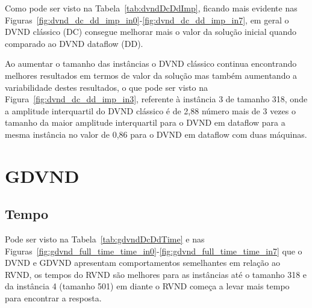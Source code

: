 Como pode ser visto na Tabela~\ref{tab:dvndDcDdImp}, ficando mais evidente nas Figuras~\ref{fig:dvnd_dc_dd_imp_in0}-\ref{fig:dvnd_dc_dd_imp_in7}, em geral o DVND clássico (DC) consegue melhorar mais o valor da solução inicial quando comparado ao DVND dataflow (DD).





Ao aumentar o tamanho das instâncias o DVND clássico continua encontrando melhores resultados em termos de valor da solução mas também aumentando a variabilidade destes resultados, o que pode ser visto na Figura~\ref{fig:dvnd_dc_dd_imp_in3}, referente à instância 3 de tamanho 318, onde a amplitude interquartil do DVND clássico é de 2,88 número mais de 3 vezes o tamanho da maior amplitude interquartil para o DVND em dataflow para a mesma instância no valor de 0,86 para o DVND em dataflow com duas máquinas.






\section{GDVND}

\subsection{Tempo}

Pode ser visto na Tabela~\ref{tab:gdvndDcDdTime} e nas Figuras~\ref{fig:gdvnd_full_time_time_in0}-\ref{fig:gdvnd_full_time_time_in7} que o DVND e GDVND apresentam comportamentos semelhantes em relação ao RVND, os tempos do RVND são melhores para as instâncias até o tamanho 318 e da instância 4 (tamanho 501) em diante o RVND começa a levar mais tempo para encontrar a resposta.

